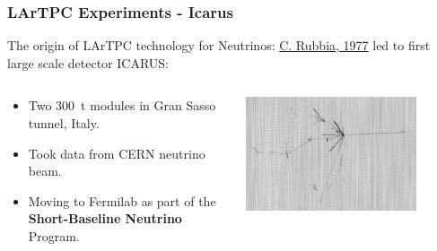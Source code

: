 \documentclass[xcolor=dvipsnames]{beamer}
\begin{document}
\begin{frame}
  \frametitle{LArTPC Experiments - Icarus}

  The origin of LArTPC technology for Neutrinos: \href{http://cds.cern.ch/record/117852/files/CERN-EP-INT-77-8.pdf}{C. Rubbia, 1977} led to first large scale detector ICARUS:

  \begin{columns}
    \begin{column}{0.5\textwidth}
      \begin{itemize}
      \item Two \SI{300}{\tonne} modules in Gran Sasso tunnel, Italy.
      \item Took data from CERN neutrino beam.
      \item Moving to Fermilab as part of the \textbf{Short-Baseline
        Neutrino} Program.
      \end{itemize}
    \end{column}
    \begin{column}{0.5\textwidth}
      \includegraphics[width=0.8\textwidth]{icarus.png}
    \end{column}
  \end{columns}
\end{frame}
\end{document}
